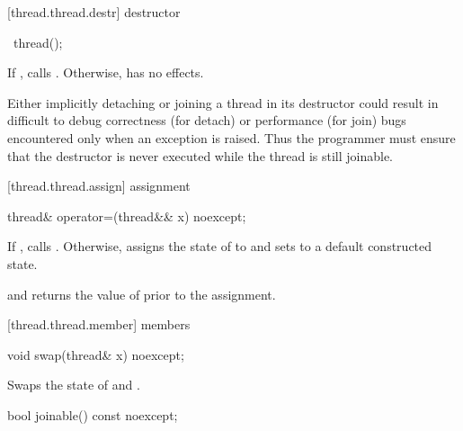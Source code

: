[thread.thread.destr]{ destructor}

%
\begin{itemdecl}
~thread();
\end{itemdecl}

\begin{itemdescr}
\pnum
If , calls . Otherwise, has no effects.
\begin{note} Either implicitly detaching or joining a  thread in its
destructor could result in difficult to debug correctness (for detach) or performance
(for join) bugs encountered only when an exception is raised. Thus the programmer must
ensure that the destructor is never executed while the thread is still joinable.
\end{note}
\end{itemdescr}

[thread.thread.assign]{ assignment}

%
%
\begin{itemdecl}
thread& operator=(thread&& x) noexcept;
\end{itemdecl}

\begin{itemdescr}
\pnum
\effects If , calls . Otherwise, assigns the
state of  to  and sets  to a default constructed state.

\pnum
\postconditions {} and  returns the value of
 prior to the assignment.

\pnum
\returns {}
\end{itemdescr}

[thread.thread.member]{ members}

%
%
\begin{itemdecl}
void swap(thread& x) noexcept;
\end{itemdecl}

\begin{itemdescr}
\pnum
\effects Swaps the state of  and .
\end{itemdescr}

%
%
\begin{itemdecl}
bool joinable() const noexcept;
\end{itemdecl}

